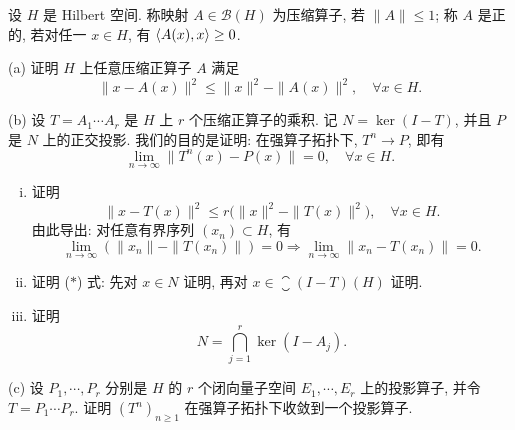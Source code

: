 \begin{exercise}
    设 $H$ 是 Hilbert 空间. 称映射 $A\in\mathcal{B}(H)$ 为压缩算子, 若 $\|A\|\leq 1$;
    称 $A$ 是正的, 若对任一 $x\in H$, 有 $\langle A(x),x\rangle\geq 0$.

    (a) 证明 $H$ 上任意压缩正算子 $A$ 满足
    \[\|x-A(x)\|^2\leq\|x\|^2-\|A(x)\|^2,\quad\forall x\in H.\]

    (b) 设 $T=A_1\cdots A_r$ 是 $H$ 上 $r$ 个压缩正算子的乘积. 记 $N=\ker(I-T)$,
    并且 $P$ 是 $N$ 上的正交投影. 我们的目的是证明: 在强算子拓扑下, $T^n\to P$, 即有
    \begin{equation}
        \lim_{n\to\infty} \|T^n(x)-P(x)\|=0,\quad\forall x\in H. \tag{$*$}
    \end{equation}
    \begin{enumerate}[(i)]
        \item 证明 \[\|x-T(x)\|^2\leq r\bigl(\|x\|^2-\|T(x)\|^2\bigr),\quad\forall x\in H.\]
              由此导出: 对任意有界序列 $(x_n)\subset H$, 有
              \[\lim_{n\to\infty}(\|x_n\|-\|T(x_n)\|)=0\Rightarrow\lim_{n\to\infty} \|x_n-T(x_n)\|=0.\]
        \item 证明 ($*$) 式: 先对 $x\in N$ 证明, 再对 $x\in\closure{(I-T)(H)}$ 证明.
        \item 证明 \[N=\bigcap_{j=1}^r \ker(I-A_j).\]
    \end{enumerate}

    (c) 设 $P_1,\cdots,P_r$ 分别是 $H$ 的 $r$ 个闭向量子空间 $E_1,\cdots,E_r$ 上的投影算子,
    并令 $T=P_1\cdots P_r$. 证明 $(T^n)_{n\geq 1}$ 在强算子拓扑下收敛到一个投影算子.
\end{exercise}


